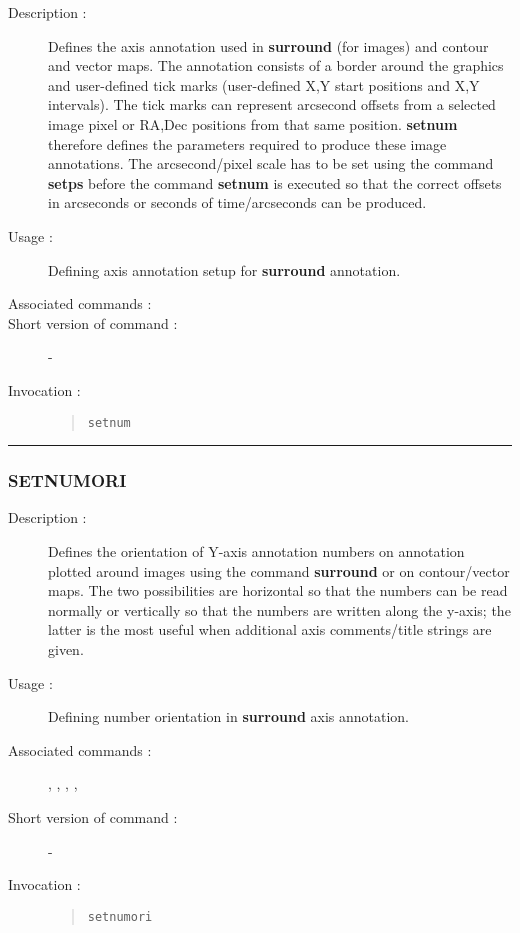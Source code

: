 \begin{description}

\item[Description :] Defines the axis annotation used in {\bf surround} (for
images) and contour and vector maps.  The annotation consists of a
border around the graphics and user-defined tick marks (user-defined
X,Y start positions and X,Y intervals).  The tick marks can represent
arcsecond offsets from a selected image pixel or RA,Dec positions from
that same position.  {\bf setnum} therefore defines the parameters
required to produce these image annotations.  The arcsecond/pixel scale
has to be set using the command {\bf setps} before the command {\bf
setnum} is executed so that the correct offsets in arcseconds or
seconds of time/arcseconds can be produced.

\item[Usage :] Defining axis annotation setup for {\bf surround} annotation.

\item[Associated commands :] {\tt {}}

\item[Short version of command :] -
\item[Invocation :]

\begin{quote}{\tt  setnum }\end{quote}

\end{description}

\hrule
\subsubsection*{\label{SETNUMORI}SETNUMORI}

\begin{description}

\item[Description :] Defines the orientation of Y-axis annotation numbers on
annotation plotted around images using the command {\bf surround} or on
contour/vector maps.  The two possibilities are horizontal so that the
numbers can be read normally or vertically so that the numbers are
written along the y-axis; the latter is the most useful when additional
axis comments/title strings are given.

\item[Usage :] Defining number orientation in {\bf surround} axis annotation.

\item[Associated commands :] {\tt {}},
{\tt {}}, {\tt {}},
{\tt {}}, {\tt {}}

\item[Short version of command :] -
\item[Invocation :]

\begin{quote}{\tt  setnumori }\end{quote}

\end{description}

